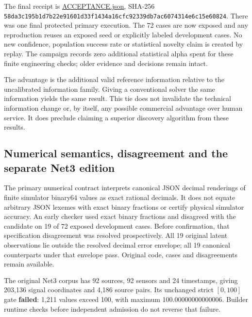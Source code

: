 \documentclass[
  11pt,
]{article}
\begin{document}
The final receipt is
\href{https://github.com/MontrealAI/AGI-Alpha-Invention-Flywheel-Lab/blob/b0d828309f14ef4dc278dc522739df85db43c460/evidence/next009/verification/primary-confirmation/artifacts/ACCEPTANCE.json}{ACCEPTANCE.json},
SHA-256
\nolinkurl{58da3c195b1d7b22e91601d33f1434a16cfc92339db7ac6074314e6c15e60824}.
There was one final protected primary execution. The 72 cases are now
exposed and any reproduction reuses an exposed seed or explicitly
labeled development cases. No new confidence, population success rate or
statistical novelty claim is created by replay. The campaign records
zero additional statistical alpha spent for these finite engineering
checks; older evidence and decisions remain intact.

The advantage is the additional valid reference information relative to
the uncalibrated information family. Giving a conventional solver the
same information yields the same result. This tie does not invalidate
the technical information change or, by itself, any possible commercial
advantage over human service. It does preclude claiming a superior
discovery algorithm from these results.

\hypertarget{numerical-semantics-disagreement-and-the-separate-net3-edition}{%
\subsection{Numerical semantics, disagreement and the separate Net3
edition}\label{numerical-semantics-disagreement-and-the-separate-net3-edition}}

The primary numerical contract interprets canonical JSON decimal
renderings of finite simulator binary64 values as exact rational
decimals. It does not equate arbitrary JSON lexemes with exact binary
fractions or certify physical simulator accuracy. An early checker used
exact binary fractions and disagreed with the candidate on 19 of 72
exposed development cases. Before confirmation, that specification
disagreement was resolved prospectively. All 19 original latent
observations lie outside the resolved decimal error envelope; all 19
canonical counterparts under that envelope pass. Original code, cases
and disagreements remain available.

The original Net3 corpus has 92 sources, 92 sensors and 24 timestamps,
giving 203,136 signal coordinates and 4,186 source pairs. Its unchanged
strict \([0,100]\) gate \textbf{failed}: 1,211 values exceed 100, with
maximum 100.00000000000006. Builder runtime checks before independent
admission do not reverse that failure.
\end{document}
